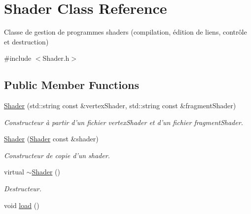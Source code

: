 \hypertarget{classShader}{\section{Shader Class Reference}
\label{classShader}
}


Classe de gestion de programmes shaders (compilation, édition de liens, contrôle et destruction)  




{\ttfamily \#include $<$Shader.\+h$>$}

\subsection*{Public Member Functions}
\begin{DoxyCompactItemize}
\item 
\hypertarget{classShader_a85497d4a14f30f3518cf096a19ffdfa9}{\hyperlink{classShader_a85497d4a14f30f3518cf096a19ffdfa9}{Shader} (std\+::string const \&vertex\+Shader, std\+::string const \&fragment\+Shader)}\label{classShader_a85497d4a14f30f3518cf096a19ffdfa9}

\begin{DoxyCompactList}\small\item\em Constructeur à partir d'un fichier vertex\+Shader et d'un fichier fragment\+Shader. \end{DoxyCompactList}\item 
\hypertarget{classShader_ac25dbd32c17223c50e045ddbf060f5c1}{\hyperlink{classShader_ac25dbd32c17223c50e045ddbf060f5c1}{Shader} (\hyperlink{classShader}{Shader} const \&shader)}\label{classShader_ac25dbd32c17223c50e045ddbf060f5c1}

\begin{DoxyCompactList}\small\item\em Constructeur de copie d'un shader. \end{DoxyCompactList}\item 
\hypertarget{classShader_aff01df87e8a102f270b5b135a295e59d}{virtual \hyperlink{classShader_aff01df87e8a102f270b5b135a295e59d}{$\sim$\+Shader} ()}\label{classShader_aff01df87e8a102f270b5b135a295e59d}

\begin{DoxyCompactList}\small\item\em Destructeur. \end{DoxyCompactList}\item 
\hypertarget{classShader_a4222b925de192c794cdef621b13a5914}{void \hyperlink{classShader_a4222b925de192c794cdef621b13a5914}{load} ()}\label{classShader_a4222b925de192c794cdef621b13a5914}


\end{DoxyCompactItemize}
